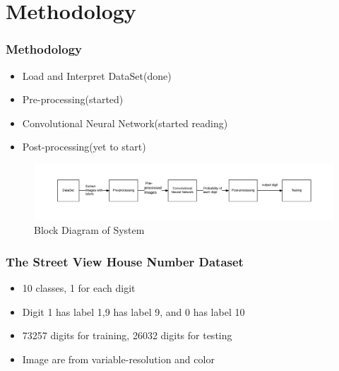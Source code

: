 \documentclass[11.5pt,aspectratio=1610,xcolor={usenames,dvipsnames,table}]{beamer}
\begin{document}



\section{Methodology}
\begin{frame}

\frametitle{Methodology}

\begin{itemize}
	\item Load and Interpret DataSet(done)
	\item Pre-processing(started)
	\item Convolutional Neural Network(started reading)
	\item Post-processing(yet to start)
\end{itemize}
\begin{figure}[!h]
	\includegraphics[width=\textwidth ]{methodology.png}
	\caption{Block Diagram of System}
\end{figure}

\end{frame}

\begin{frame}

\frametitle{The Street View House Number Dataset \cite{SVHN}}

\begin{itemize}
	\item 10 classes, 1 for each digit
	\item Digit 1 has label 1,9 has label 9, and 0 has label 10
	\item 73257 digits for training, 26032 digits for testing
	\item Image are from variable-resolution and color 
\end{itemize}

\end{frame}
\end{document}
